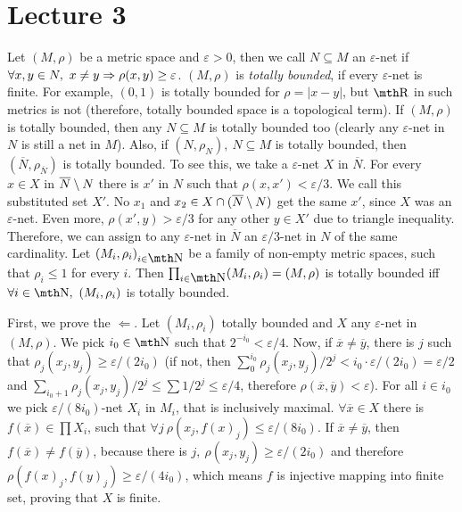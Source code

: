 \chapter{Lecture 3}

 Let $(M,\rho)$ be a metric space and 
$\varepsilon>0$, then we call $N\subseteq M$ an $\varepsilon$-net 
if $\forall x,y \in N,\ x\neq y \Rightarrow \rho(x,y) \geq \varepsilon$. 
$(M,\rho)$ is {\it totally bounded}, if every $\varepsilon$-net 
is finite. For example, $(0,1)$ is totally bounded for $\rho=|x-y|$,
but $\R$ in such metrics is not (therefore, totally bounded space 
is a topological term).
\smallskip
If $(M,\rho)$ is totally bounded, then any $N\subseteq M$ is totally 
bounded too (clearly any $\varepsilon$-net in $N$ is still a net in 
$M$). Also, if $(N,\rho_{N}),\ N\subseteq M$ is totally bounded,
then $(\overline N,\rho_{\overline N})$ is totally bounded. To see 
this, we take a $\varepsilon$-net $X$ in $\overline N$. For every 
$x\in X$ in $\overline N \setminus N$ there is $x'$ in $N$ such that $\rho(x,x')
< \varepsilon/3$. We call this substituted set $X'$. No $x_1$ and $x_2 \in X\cap
(\overline N \setminus N)$ get the same $x'$, since $X$ was an $\varepsilon$-net. Even
more, $\rho(x',y)> \varepsilon/3$ for any other $y\in X'$ due to triangle 
inequality. Therefore, we can assign to any $\varepsilon$-net in 
$\overline N$ an $\varepsilon/3$-net in $N$ of the same cardinality.
\smallskip
Let $(M_i,\rho_i)_{i\in \N}$ be a family of non-empty metric spaces,
such that $\rho_i \leq 1$ for every $i$. Then $\prod_{i\in \N} 
(M_i,\rho_i) = (M,\rho)$ is totally bounded iff $\forall i\in \N,\ 
(M_i,\rho_i)$ is totally bounded.

First, we prove the $\Leftarrow$. Let $(M_i,\rho_i)$ totally bounded 
and $X$ any $\varepsilon$-net in $(M,\rho)$. We pick $i_0\in \N$ 
such that $2^{-i_0} < \varepsilon/4$. Now, if $\overline x \neq 
\overline y$, there is $j$ such that $\rho_j(x_j,y_j) \geq 
\varepsilon / (2i_0)$ (if not, then $\sum_0^{i_0} \rho_j(x_j,y_j)/
2^{j} < i_0 \cdot \varepsilon/(2i_0) = \varepsilon/2$ and 
$\sum_{i_0 +1} \rho_j(x_j,y_j) / 2^j \leq \sum 1/2^j \leq 
\varepsilon/4$, therefore $\rho(\overline x, \overline y) < 
\varepsilon$). For all $i\in i_0$ we pick $\varepsilon/(8i_0)$-net
$X_i$ in $M_i$, that is inclusively maximal. $\forall \overline x 
\in X$ there is $f(\overline x)\in \prod X_i$, such that $\forall j\ 
\rho(x_j, f(x)_j) \leq \varepsilon/(8i_0)$. 
If $\overline x\neq \overline y$, then $f(\overline x) \neq f(\overline 
y)$, because 
there is $j,\ \rho(x_j,y_j)\geq \varepsilon /(2i_0)$ and therefore 
$\rho(f(x)_j,f(y)_j) \geq \varepsilon /(4i_0)$, which means
$f$ is injective mapping into finite set, proving that $X$ is 
finite.


